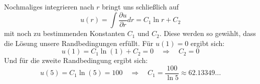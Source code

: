 	
	Nochmaliges integrieren nach $r$ bringt uns schließlich auf
	\begin{equation}
	u(r)= 	\int \frac{\partial u}{\partial r} dr = C_1 \ln r + C_2
	\end{equation}
	mit noch zu bestimmenden Konstanten $C_1$ und $C_2$. Diese werden so gewählt, dass die Lösung unsere Randbedingungen erfüllt. Für $u(1) = 0$ ergibt sich:
	\begin{equation}
	u(1)=C_1 \ln(1) + C_2 =  0 \quad \Rightarrow \quad C_2 = 0
	\end{equation}
	Und für die zweite Randbedingung ergibt sich:
	\begin{equation}
	u(5)=C_1 \ln(5)  = 100 \quad \Rightarrow \quad C_1 =\frac{100}{\ln 5} \approx 62.13349...
	\end{equation}
	\\
	

	
